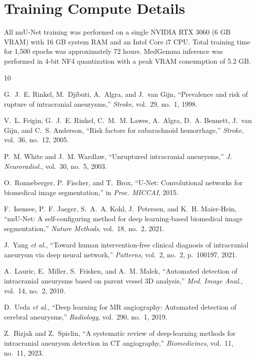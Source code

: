 \documentclass[journal]{IEEEtran}
\begin{document}
\section{Training Compute Details}
All nnU-Net training was performed on a single NVIDIA RTX 3060 (6 GB VRAM)
with 16 GB system RAM and an Intel Core i7 CPU. Total training time for 1,500
epochs was approximately 72 hours. MedGemma inference was performed in 4-bit
NF4 quantization with a peak VRAM consumption of 5.2 GB.

\begin{thebibliography}{10}

G.~J.~E. Rinkel, M.~Djibuti, A.~Algra, and J.~van Gijn,
``Prevalence and risk of rupture of intracranial aneurysms,''
\textit{Stroke}, vol.~29, no.~1, 1998.

V.~L. Feigin, G.~J.~E. Rinkel, C.~M.~M. Lawes, A.~Algra, D.~A. Bennett,
J.~van Gijn, and C.~S. Anderson,
``Risk factors for subarachnoid hemorrhage,''
\textit{Stroke}, vol.~36, no.~12, 2005.

P.~M. White and J.~M. Wardlaw,
``Unruptured intracranial aneurysms,''
\textit{J. Neuroradiol.}, vol.~30, no.~5, 2003.

O.~Ronneberger, P.~Fischer, and T.~Brox,
``U-Net: Convolutional networks for biomedical image segmentation,''
in \textit{Proc. MICCAI}, 2015.

F.~Isensee, P.~F. Jaeger, S.~A.~A. Kohl, J.~Petersen, and K.~H. Maier-Hein,
``nnU-Net: A self-configuring method for deep learning-based biomedical
image segmentation,''
\textit{Nature Methods}, vol.~18, no.~2, 2021.

J.~Yang \textit{et al.},
``Toward human intervention-free clinical diagnosis of intracranial aneurysm
via deep neural network,''
\textit{Patterns}, vol.~2, no.~2, p.~100197, 2021.

A.~Lauric, E.~Miller, S.~Frisken, and A.~M. Malek,
``Automated detection of intracranial aneurysms based on parent vessel
3D analysis,''
\textit{Med. Image Anal.}, vol.~14, no.~2, 2010.

D.~Ueda \textit{et al.},
``Deep learning for MR angiography: Automated detection of cerebral
aneurysms,''
\textit{Radiology}, vol.~290, no.~1, 2019.

Z.~Bizjak and Z.~Spiclin,
``A systematic review of deep-learning methods for intracranial aneurysm
detection in CT angiography,''
\textit{Biomedicines}, vol.~11, no.~11, 2023.


\end{thebibliography}
\end{document}
